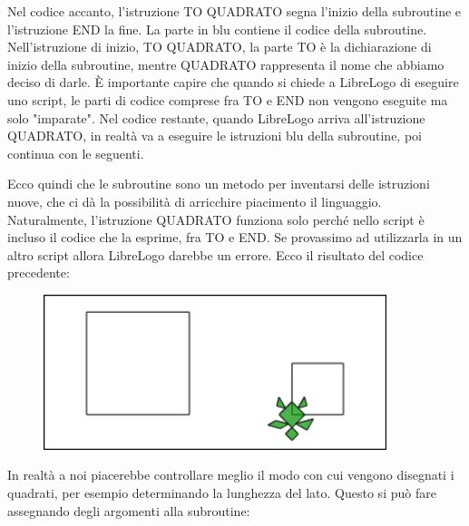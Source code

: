 \begin{minipage}{0.45\textwidth}
Nel codice accanto, l'istruzione \color{green}TO \color{red}QUADRATO \color{black}segna l'inizio della subroutine e
l'istruzione \color{green}END \color{black}la fine. La parte in blu contiene il codice della subroutine.
Nell'istruzione di inizio, \color{green}TO \color{red}QUADRATO\color{black}, la parte \color{green}TO \color{black}è la dichiarazione di
inizio della subroutine, mentre \color{red}QUADRATO \color{black}rappresenta il nome che
abbiamo deciso di darle. È importante capire che quando si chiede a
LibreLogo di eseguire uno script, le parti di codice comprese fra \color{green}TO \color{black}e
\color{green}END \color{black}non vengono eseguite ma solo "imparate". Nel codice restante,
quando LibreLogo arriva all'istruzione \color{red}QUADRATO\color{black}, in realtà va a
eseguire le istruzioni blu della subroutine, poi continua con le
seguenti. 

\end{minipage} \hfill

\vskip 0.5cm

Ecco quindi che le subroutine sono un metodo per inventarsi
delle istruzioni nuove, che ci dà la possibilità di arricchire
piacimento il linguaggio. Naturalmente, l'istruzione QUADRATO funziona
solo perché nell\color{black}o script è incluso il codice che la esprime, fra \color{green}TO \color{black}e
\color{green}END\color{black}. Se provassimo ad utilizzarla in un altro script allora LibreLogo
darebbe un errore. Ecco il risultato del codice precedente: 

\vskip 0.5cm

\begin{figure}[H]
   \includegraphics[width=10.0cm,trim=4 4 8 4,clip]{./images/incapsulare/incapsulare-3.png}
   \label{inc-2}
\end{figure}

\vskip 0.5cm

In realtà a noi piacerebbe controllare meglio il modo con cui vengono disegnati i quadrati, per esempio determinando la lunghezza del lato. Questo si può fare assegnando degli argomenti alla subroutine:


